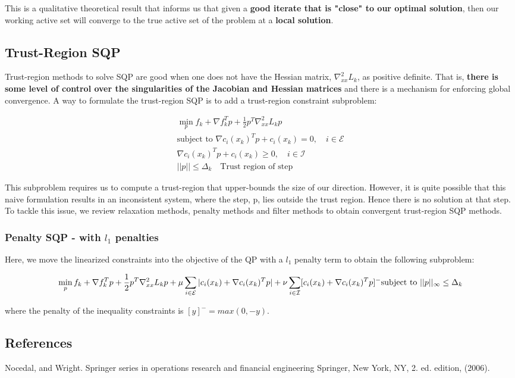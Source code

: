 \documentclass[class=article, crop=false]{standalone}
\begin{document}
		This is a qualitative theoretical result that informs us that given a \textbf{good iterate that is "close" to our optimal solution}, then our working active set will converge to the true active set of the problem at a \textbf{local solution}.

	\subsection{Trust-Region SQP}
		Trust-region methods to solve SQP are good when one does not have the Hessian matrix, $\nabla_{xx}^2 L_k$, as positive definite. That is, \textbf{there is some level of control over the singularities of the Jacobian and Hessian matrices} and there is a mechanism for enforcing global convergence. A way to formulate the trust-region SQP is to add a trust-region constraint subproblem:

			\begin{align}
			\label{eq:trust_region_sqp_problem}
			\min_p f_k + \nabla f_k^T p + \frac{1}{2} p^T \nabla_{xx}^2 L_k p \\
			\text{subject to } \nabla c_i(x_k)^T p + c_i(x_k) = 0,\quad i \in \mathcal{E} \\
			\nabla c_i(x_k)^T p + c_i(x_k) \ge 0, \quad i \in \mathcal{I} \\
			||p|| \le \Delta_k \quad \text{Trust region of step}
			\end{align}

		This subproblem requires us to compute a trust-region that upper-bounds the size of our direction. However, it is quite possible that this naive formulation results in an inconsistent system, where the step, p, lies outside the trust region. Hence there is no solution at that step. To tackle this issue, we review relaxation methods, penalty methods and filter methods to obtain convergent trust-region SQP methods.

		\subsubsection{Penalty SQP - with $l_1$ penalties}
			Here, we move the linearized constraints into the objective of the QP with a $l_1$ penalty term to obtain the following subproblem:

				$$\min_p f_k + \nabla f_k^T p + \frac{1}{2} p^T \nabla_{xx}^2 L_k p + \mu \sum_{i \in \mathcal{E}} |c_i(x_k) + \nabla c_i(x_k)^T p | + \nu \sum_{i \in \mathcal{I}} [c_i(x_k) + \nabla c_i(x_k)^T p ]^- \\ \text{subject to } ||p||_\infty \le \Delta_k$$

			where the penalty of the inequality constraints is $[y]^- = max(0, -y)$.

	\subsection{References}
		Nocedal, and Wright. Springer series in operations research and financial engineering Springer, New York, NY, 2. ed. edition, (2006).
\end{document}
